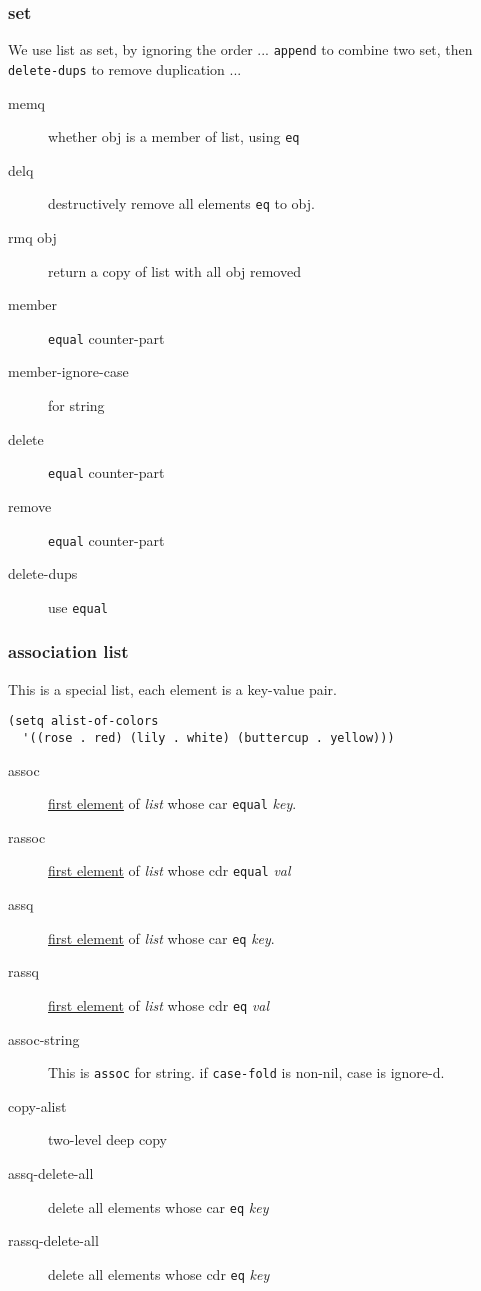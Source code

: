 \subsubsection{set}
We use list as set, by ignoring the order ...
\texttt{append} to combine two set, then \texttt{delete-dups} to remove duplication ...

\begin{description}
\item [memq ] whether obj is a member of list, using \texttt{eq}
\item [delq ] destructively remove all elements \texttt{eq} to obj.
\item [rmq obj ] return a copy of list with all obj removed
\item [member] \texttt{equal} counter-part
\item [member-ignore-case] for string
\item [delete] \texttt{equal} counter-part
\item [remove] \texttt{equal} counter-part
\item [delete-dups] use \texttt{equal}
\end{description}

\subsubsection{association list}
This is a special list, each element is a key-value pair.

\begin{lstlisting}
(setq alist-of-colors
  '((rose . red) (lily . white) (buttercup . yellow)))
\end{lstlisting}


\begin{description}
\item [assoc ]
  \uline{first element} of \textit{list} whose car \texttt{equal} \textit{key}.
\item [rassoc ]
  \uline{first element} of \textit{list} whose cdr \texttt{equal} \textit{val}
\item [assq ]
  \uline{first element} of \textit{list} whose car \texttt{eq} \textit{key}.
\item [rassq]
  \uline{first element} of \textit{list} whose cdr \texttt{eq} \textit{val}
\item [assoc-string ] This is \texttt{assoc} for
  string. if \texttt{case-fold} is non-nil, case is ignore-d.

\item [copy-alist ] two-level deep copy
\item [assq-delete-all ] delete all elements whose car \texttt{eq} \textit{key}
\item [rassq-delete-all ] delete all elements whose cdr \texttt{eq} \textit{key}
\end{description}

